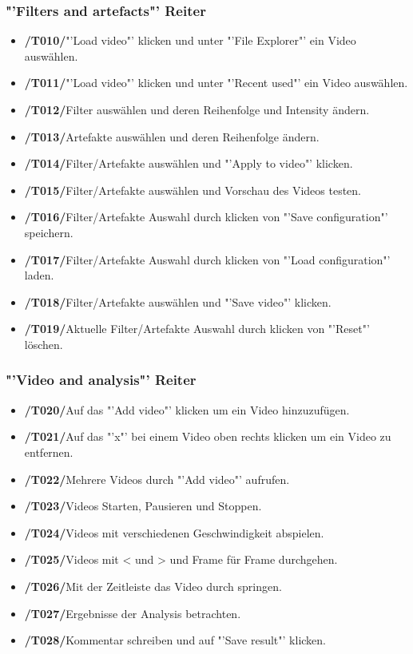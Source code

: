 \documentclass[parskip=full]{scrartcl}
\begin{document}
\subsubsection{"'Filters and artefacts"' Reiter}
\begin{itemize}
\item[]\textbf{/T010/}\qquad "'Load video"' klicken und unter "'File Explorer"' ein Video auswählen.
\item[]\textbf{/T011/}\qquad "'Load video"' klicken und unter "'Recent used"' ein Video auswählen.
\item[]\textbf{/T012/}\qquad Filter auswählen und deren Reihenfolge und Intensity ändern.
\item[]\textbf{/T013/}\qquad Artefakte auswählen und deren Reihenfolge  ändern.
\item[]\textbf{/T014/}\qquad Filter/Artefakte auswählen und "'Apply to video"' klicken.
\item[]\textbf{/T015/}\qquad Filter/Artefakte auswählen und Vorschau des Videos testen.
\item[]\textbf{/T016/}\qquad Filter/Artefakte Auswahl durch klicken von "'Save configuration"' speichern.
\item[]\textbf{/T017/}\qquad Filter/Artefakte Auswahl durch klicken von "'Load configuration"' laden.
\item[]\textbf{/T018/}\qquad Filter/Artefakte auswählen und "'Save video"' klicken.
\item[]\textbf{/T019/}\qquad Aktuelle Filter/Artefakte Auswahl durch klicken von "'Reset"' löschen.
\end{itemize}
\subsubsection{"'Video and analysis"' Reiter}
\begin{itemize}
\item[]\textbf{/T020/}\qquad Auf das "'Add video"' klicken um ein Video hinzuzufügen.
\item[]\textbf{/T021/}\qquad Auf das "'x"' bei einem Video oben rechts klicken um ein Video zu entfernen.
\item[]\textbf{/T022/}\qquad Mehrere Videos durch "'Add video"' aufrufen.
\item[]\textbf{/T023/}\qquad Videos Starten, Pausieren und Stoppen.
\item[]\textbf{/T024/}\qquad Videos mit verschiedenen Geschwindigkeit abspielen.
\item[]\textbf{/T025/}\qquad Videos mit < und > und Frame für Frame  durchgehen.
\item[]\textbf{/T026/}\qquad Mit der Zeitleiste das Video durch springen.
\item[]\textbf{/T027/}\qquad Ergebnisse der Analysis betrachten.
\item[]\textbf{/T028/}\qquad Kommentar schreiben und auf "'Save result"' klicken.
\end{itemize}
\end{document}
